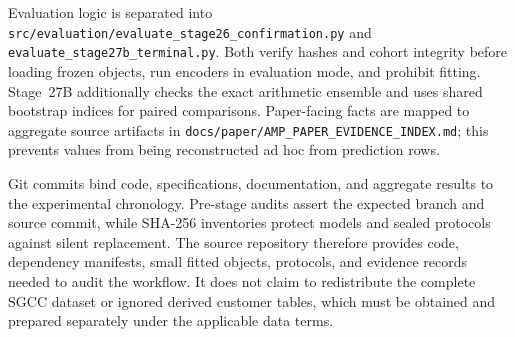 Evaluation logic is separated into \texttt{src/evaluation/evaluate\_stage26\_confirmation.py} and \texttt{evaluate\_stage27b\_terminal.py}. Both verify hashes and cohort integrity before loading frozen objects, run encoders in evaluation mode, and prohibit fitting. Stage~27B additionally checks the exact arithmetic ensemble and uses shared bootstrap indices for paired comparisons. Paper-facing facts are mapped to aggregate source artifacts in \texttt{docs/paper/AMP\_PAPER\_EVIDENCE\_INDEX.md}; this prevents values from being reconstructed ad hoc from prediction rows.

Git commits bind code, specifications, documentation, and aggregate results to the experimental chronology. Pre-stage audits assert the expected branch and source commit, while SHA-256 inventories protect models and sealed protocols against silent replacement. The source repository therefore provides code, dependency manifests, small fitted objects, protocols, and evidence records needed to audit the workflow. It does not claim to redistribute the complete SGCC dataset or ignored derived customer tables, which must be obtained and prepared separately under the applicable data terms.
